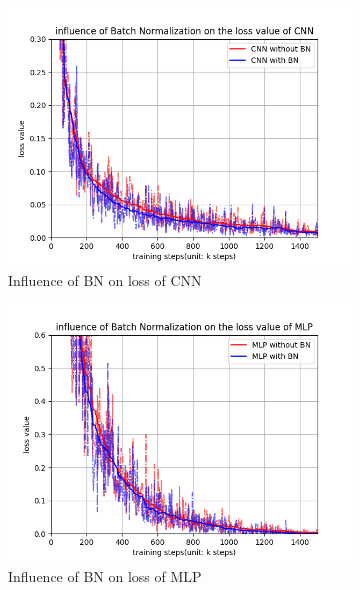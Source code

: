 \documentclass[12pt,letterpaper]{article}
\begin{document}
\begin{figure}[h]
    \medskip
    \begin{subfigure}{0.32\textwidth}
    \includegraphics[width=\linewidth]{CNN_BN_loss.png}
    \caption{\small Influence of BN on loss of CNN} \label{fig:c}
    \end{subfigure}\hspace*{\fill}
    \begin{subfigure}{0.32\textwidth}
    \includegraphics[width=\linewidth]{MLP_BN_loss.png}
    \caption{\small Influence of BN on loss of MLP} \label{fig:d}
    \end{subfigure}
    \begin{subfigure}{0.32\textwidth}

\end{subfigure}
\end{figure}
\end{document}
